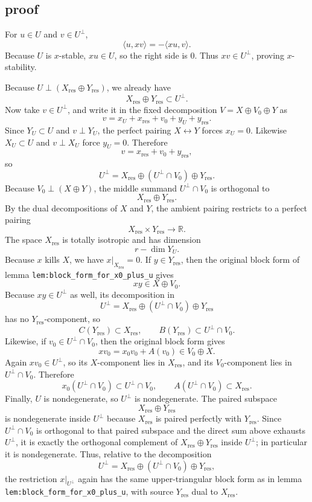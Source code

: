 \documentclass[
]{article}
\begin{document}
\subsection{proof}\label{proof-15}

For \(u\in U\) and \(v\in U^\perp\), \[
\langle u,xv\rangle=-\langle xu,v\rangle.
\] Because \(U\) is \(x\)-stable, \(xu\in U\), so the right side is
\(0\). Thus \(xv\in U^\perp\), proving \(x\)-stability.

Because \(U\perp (X_{\mathrm{res}}\oplus Y_{\mathrm{res}})\), we already
have \[
X_{\mathrm{res}}\oplus Y_{\mathrm{res}}\subset U^\perp.
\] Now take \(v\in U^\perp\), and write it in the fixed decomposition
\(V=X\oplus V_0\oplus Y\) as \[
v=x_U+x_{\mathrm{res}}+v_0+y_U+y_{\mathrm{res}}.
\] Since \(Y_U\subset U\) and \(v\perp Y_U\), the perfect pairing
\(X\leftrightarrow Y\) forces \(x_U=0\). Likewise \(X_U\subset U\) and
\(v\perp X_U\) force \(y_U=0\). Therefore \[
v=x_{\mathrm{res}}+v_0+y_{\mathrm{res}},
\] so \[
U^\perp=X_{\mathrm{res}}\oplus (U^\perp\cap V_0)\oplus Y_{\mathrm{res}}.
\] Because \(V_0\perp (X\oplus Y)\), the middle summand
\(U^\perp\cap V_0\) is orthogonal to \[
X_{\mathrm{res}}\oplus Y_{\mathrm{res}}.
\] By the dual decompositions of \(X\) and \(Y\), the ambient pairing
restricts to a perfect pairing \[
X_{\mathrm{res}}\times Y_{\mathrm{res}}\longrightarrow \mathbb R.
\] The space \(X_{\mathrm{res}}\) is totally isotropic and has dimension
\[
r-\dim Y_U.
\] Because \(x\) kills \(X\), we have \(x|_{X_{\mathrm{res}}}=0\). If
\(y\in Y_{\mathrm{res}}\), then the original block form of lemma
\texttt{lem:block\_form\_for\_x0\_plus\_u} gives \[
x y\in X\oplus V_0.
\] Because \(xy\in U^\perp\) as well, its decomposition in \[
U^\perp=X_{\mathrm{res}}\oplus (U^\perp\cap V_0)\oplus Y_{\mathrm{res}}
\] has no \(Y_{\mathrm{res}}\)-component, so \[
C(Y_{\mathrm{res}})\subset X_{\mathrm{res}},
\qquad
B(Y_{\mathrm{res}})\subset U^\perp\cap V_0.
\] Likewise, if \(v_0\in U^\perp\cap V_0\), then the original block form
gives \[
xv_0=x_0v_0+A(v_0)\in V_0\oplus X.
\] Again \(xv_0\in U^\perp\), so its \(X\)-component lies in
\(X_{\mathrm{res}}\), and its \(V_0\)-component lies in
\(U^\perp\cap V_0\). Therefore \[
x_0(U^\perp\cap V_0)\subset U^\perp\cap V_0,
\qquad
A(U^\perp\cap V_0)\subset X_{\mathrm{res}}.
\] Finally, \(U\) is nondegenerate, so \(U^\perp\) is nondegenerate. The
paired subspace \[
X_{\mathrm{res}}\oplus Y_{\mathrm{res}}
\] is nondegenerate inside \(U^\perp\) because \(X_{\mathrm{res}}\) is
paired perfectly with \(Y_{\mathrm{res}}\). Since \(U^\perp\cap V_0\) is
orthogonal to that paired subspace and the direct sum above exhausts
\(U^\perp\), it is exactly the orthogonal complement of
\(X_{\mathrm{res}}\oplus Y_{\mathrm{res}}\) inside \(U^\perp\); in
particular it is nondegenerate. Thus, relative to the decomposition \[
U^\perp=X_{\mathrm{res}}\oplus (U^\perp\cap V_0)\oplus Y_{\mathrm{res}},
\] the restriction \(x|_{U^\perp}\) again has the same upper-triangular
block form as in lemma \texttt{lem:block\_form\_for\_x0\_plus\_u}, with
source \(Y_{\mathrm{res}}\) dual to \(X_{\mathrm{res}}\).
\end{document}
